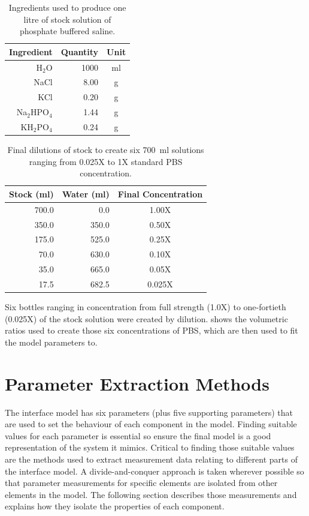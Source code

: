   \begin{table}
    \centering
    \begin{tabular}{r | r | c}
      Ingredient & Quantity & Unit \\
      \hline
      H$_2$O & 1000 & ml \\
      NaCl & 8.00  & g  \\
      KCl  & 0.20  & g  \\
      Na$_2$HPO$_4$ & 1.44 & g \\
      KH$_2$PO$_4$  & 0.24 & g \\
    \end{tabular}
    \caption{\label{tab:pt2-PBS-recipe}Ingredients used to produce one litre of stock solution of phosphate buffered saline.}
  \end{table}

  \begin{table}
    \centering
    \begin{tabular}{r | r | c}
      Stock (ml) & Water (ml) & Final Concentration \\
      \hline
      700.0 &   0.0 & 1.00X \\
      350.0 & 350.0 & 0.50X \\
      175.0 & 525.0 & 0.25X \\
       70.0 & 630.0 & 0.10X \\
       35.0 & 665.0 & 0.05X \\
       17.5 & 682.5 & 0.025X\\
    \end{tabular}
    \caption{\label{tab:pt2-PBS-concentration}Final dilutions of stock to create six \SI{700}{\milli\litre} solutions ranging from 0.025X to 1X standard PBS concentration.}
  \end{table}

  Six bottles ranging in concentration from full strength (1.0X) to one-fortieth (0.025X) of the stock solution were created by dilution.
   shows the volumetric ratios used to create those six concentrations of PBS, which are then used to fit the model parameters to.



\section{Parameter Extraction Methods}


  The interface model has six parameters (plus five supporting parameters) that are used to set the behaviour of each component in the model.
  Finding suitable values for each parameter is essential so ensure the final model is a good representation of the system it mimics.
  Critical to finding those suitable values are the methods used to extract measurement data relating to different parts of the interface model.
  A divide-and-conquer approach is taken wherever possible so that parameter measurements for specific elements are isolated from other elements in the model.
  The following section describes those measurements and explains how they isolate the properties of each component.

